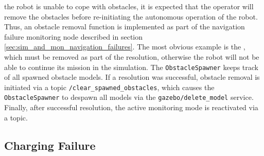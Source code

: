 \documentclass[english, master, utf8]{base/thesis_KBS}
\newcommand{\code}[1]{\colorbox{light-gray}{\texttt{#1}}}
\begin{document}
the robot is unable to cope with obstacles, it is expected that the operator will remove the obstacles before re-initiating the autonomous operation of the robot. Thus, an obstacle
removal function is implemented as part of the navigation failure monitoring node described in section \ref{sec:sim_and_mon_navigation_failures}. The most obvious example is the
, which must be removed as part of the resolution, otherwise the robot will not be able to continue its mission in the simulation. The \code{ObstacleSpawner}
keeps track of all spawned obstacle models. If a resolution was successful, obstacle removal is initiated via a topic \code{/clear\_spawned\_obstacles}, which causes the
\code{ObstacleSpawner} to despawn all models via the \code{gazebo/delete\_model} service. Finally, after successful resolution, the active monitoring mode is reactivated via a topic.

\subsection{Charging Failure}
\label{sec:charging_failure_resolver}
\end{document}

